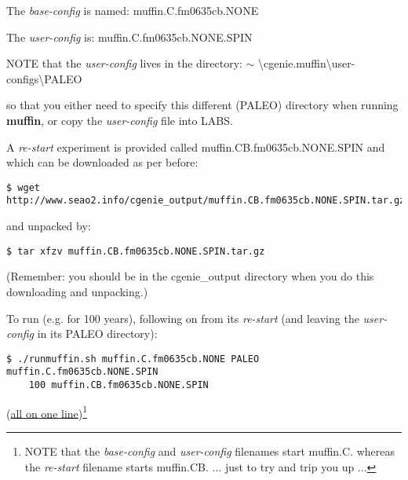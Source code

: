\documentclass[11pt,fleqn]{book} %
\begin{document}
\vspace{1mm}
The \textit{base-config} is named: \textsf{\footnotesize muffin.C.fm0635cb.NONE}

\vspace{1mm}
The \textit{user-config} is: \textsf{\footnotesize muffin.C.fm0635cb.NONE.SPIN}

\vspace{1mm}
NOTE that the \textit{user-config} lives in the directory: \textsf{\footnotesize \(\sim\) \textbackslash cgenie.muffin\textbackslash user-configs\textbackslash PALEO}

\noindent so that you either need to specify this different (\textsf{\footnotesize PALEO}) directory when running \textbf{muffin}, or copy the \textit{user-config} file into \textsf{\footnotesize LABS}.

\vspace{1mm}
A \textit{re-start }experiment is provided called \textsf{\footnotesize muffin.CB.fm0635cb.NONE.SPIN} and which can be downloaded as per before:

\vspace{-2mm}
\begin{verbatim}
$ wget http://www.seao2.info/cgenie_output/muffin.CB.fm0635cb.NONE.SPIN.tar.gz
\end{verbatim}
\vspace{-2mm}

\noindent and unpacked by:

\vspace{-2mm}
\begin{verbatim}
$ tar xfzv muffin.CB.fm0635cb.NONE.SPIN.tar.gz
\end{verbatim}
\vspace{-2mm}

\noindent (Remember: you should be in the \textsf{\footnotesize cgenie\_output} directory when you do this downloading and unpacking.)

To run (e.g. for 100 years), following on from its \textit{re-start} (and leaving the \textit{user-config} in its \textsf{\footnotesize PALEO} directory):

\vspace{-2mm}
\begin{verbatim}
$ ./runmuffin.sh muffin.C.fm0635cb.NONE PALEO muffin.C.fm0635cb.NONE.SPIN
    100 muffin.CB.fm0635cb.NONE.SPIN
\end{verbatim}
\vspace{-2mm}

\noindent (\uline{all on one line})\footnote{NOTE that the \textit{base-config} and \textit{user-config} filenames start \textsf{\footnotesize muffin.C.} whereas the\textit{ re-start} filename starts \textsf{\footnotesize muffin.CB.} ... just to try and trip you up ...}
\end{document}
